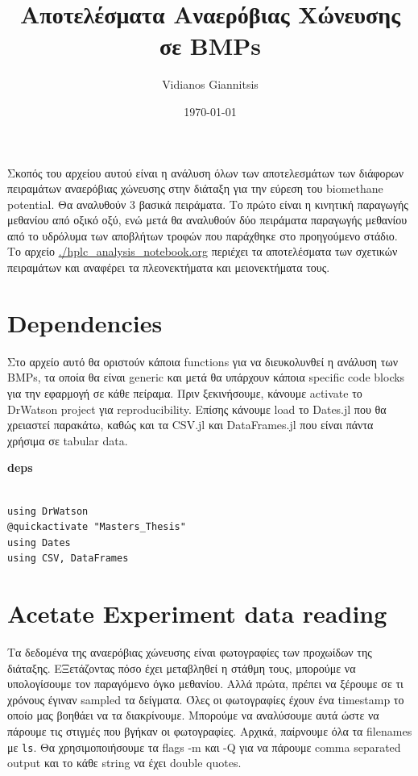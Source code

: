 \documentclass[11pt]{article}
\author{Vidianos Giannitsis}
\date{\today}
\title{Αποτελέσματα Αναερόβιας Χώνευσης σε BMPs}
\begin{document}
\maketitle
\tableofcontents

Σκοπός του αρχείου αυτού είναι η ανάλυση όλων των αποτελεσμάτων των διάφορων πειραμάτων αναερόβιας χώνευσης στην διάταξη για την εύρεση του biomethane potential. Θα αναλυθούν 3 βασικά πειράματα. Το πρώτο είναι η κινητική παραγωγής μεθανίου από οξικό οξύ, ενώ μετά θα αναλυθούν δύο πειράματα παραγωγής μεθανίου από το υδρόλυμα των αποβλήτων τροφών που παράχθηκε στο προηγούμενο στάδιο. Το αρχείο \url{./hplc\_analysis\_notebook.org} περιέχει τα αποτελέσματα των σχετικών πειραμάτων και αναφέρει τα πλεονεκτήματα και μειονεκτήματα τους.

\section{Dependencies}
\label{sec:org9806788}
Στο αρχείο αυτό θα οριστούν κάποια functions για να διευκολυνθεί η ανάλυση των BMPs, τα οποία θα είναι generic και μετά θα υπάρχουν κάποια specific code blocks για την εφαρμογή σε κάθε πείραμα. Πριν ξεκινήσουμε, κάνουμε activate το DrWatson project για reproducibility. Επίσης κάνουμε load το Dates.jl που θα χρειαστεί παρακάτω, καθώς και τα CSV.jl και DataFrames.jl που είναι πάντα χρήσιμα σε tabular data.

\textbf{deps}
\begin{verbatim}

using DrWatson
@quickactivate "Masters_Thesis"
using Dates
using CSV, DataFrames

\end{verbatim}

\section{Acetate Experiment data reading}
\label{sec:org386b80a}
Τα δεδομένα της αναερόβιας χώνευσης είναι φωτογραφίες των προχωίδων της διάταξης. ΕΞετάζοντας πόσο έχει μεταβληθεί η στάθμη τους, μπορούμε να υπολογίσουμε τον παραγόμενο όγκο μεθανίου. Αλλά πρώτα, πρέπει να ξέρουμε σε τι χρόνους έγιναν sampled τα δείγματα. Όλες οι φωτογραφίες έχουν ένα timestamp το οποίο μας βοηθάει να τα διακρίνουμε. Μπορούμε να αναλύσουμε αυτά ώστε να πάρουμε τις στιγμές που βγήκαν οι φωτογραφίες. Αρχικά, παίρνουμε όλα τα filenames με \texttt{ls}. Θα χρησιμοποιήσουμε τα flags -m και -Q για να πάρουμε comma separated output και το κάθε string να έχει double quotes.
\end{document}
